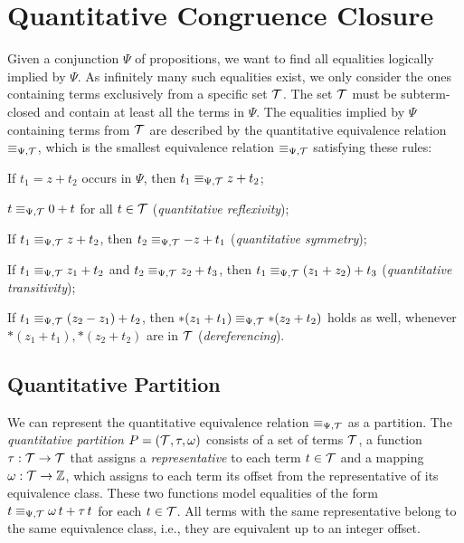 \section{Quantitative Congruence Closure}\label{chapter:qcc}

Given a conjunction $\Psi$ of propositions, we want to find all equalities logically implied by $\Psi$.
As infinitely many such equalities exist, we only consider the ones containing terms exclusively from a specific set $\mathcal{T}$.
The set $\mathcal{T}$ must be subterm-closed and contain at least all the terms in $\Psi$.
The equalities implied by $\Psi$ containing terms from $\mathcal{T}$ are described by the quantitative equivalence relation $\equiv_{\Psi,\mathcal{T}}$, which is the smallest equivalence relation $\equiv_{\Psi,\mathcal{T}}$ satisfying these rules:
\begin{enumerate}[label={[E\arabic*]}, ref={[E\arabic*]}]
  \setcounter{enumi}{-1}
  \item\label{item:persistence} If $t_1 = z+t_2$ occurs in $\Psi$, then $t_1 \equiv_{\Psi,\mathcal{T}} z+t_2$;
  \item\label{item:quantitative-reflexivity} $t \equiv_{\Psi,\mathcal{T}} 0+t$ for all $t\in\mathcal{T}$ (\emph{quantitative reflexivity});
  \item\label{item:quantitative-symmetry} If $t_1 \equiv_{\Psi,\mathcal{T}} z+t_2$, then $t_2 \equiv_{\Psi,\mathcal{T}} -z+t_1$ (\emph{quantitative symmetry});
  \item\label{item:quantitative-transitivity} If $t_1 \equiv_{\Psi,\mathcal{T}} z_1+t_2$ and $t_2 \equiv_{\Psi,\mathcal{T}} z_2 + t_3$,
  then $t_1 \equiv_{\Psi,\mathcal{T}} (z_1+z_2)+t_3$ (\emph{quantitative transitivity});
  \item\label{item:dereferencing} If $t_1 \equiv_{\Psi,\mathcal{T}} (z_2 - z_1) + t_2$, then $*(z_1 + t_1) \equiv_{\Psi,\mathcal{T}} *(z_2 + t_2)$ holds as well, whenever $*(z_1 + t_1),  *(z_2 + t_2)$ are in $\mathcal{T}$ (\emph{dereferencing}).
\end{enumerate}

\subsection{Quantitative Partition}\label{subsection:quantitative-union-find}

We can represent the quantitative equivalence relation $\equiv_{\Psi,\mathcal{T}}$ as a partition.
The \emph{quantitative partition} $P = (\mathcal{T}, \tau, \omega)$ consists of a set of terms $\mathcal{T}$,
a function $\tau : \mathcal{T} \rightarrow \mathcal{T}$ that assigns a \emph{representative} to each term $t \in \mathcal{T}$ and a mapping $\omega : \mathcal{T} \rightarrow \mathbb{Z}$,
which assigns to each term its offset from the representative of its equivalence class.
These two functions model equalities of the form $t \equiv_{\Psi,\mathcal{T}} \omega\,t + \tau\,t$ for each $t \in \mathcal{T}$.
All terms with the same representative belong to the same equivalence class, i.e., they are equivalent up to an integer offset.

